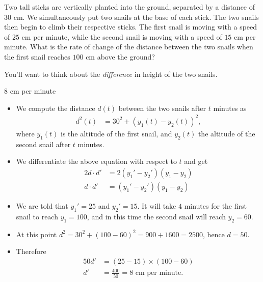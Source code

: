 %



\begin{Mquestion}[2015Q]
Two tall sticks are vertically planted into the ground, separated by a distance of $30$ cm. We simultaneously put two snails at the base of each stick. The two snails then begin to climb their respective sticks. The first snail is moving with a speed of $25$ cm per minute, while the second snail is moving with a speed of $15$ cm per minute.
What is the rate of
change of the distance between the two snails when the first snail reaches $100$ cm above the ground?
\end{Mquestion}
\begin{hint}
You'll want to think about the \emph{difference} in height of the two snails.
\end{hint}
\begin{answer}
$8$ cm per minute
\end{answer}
\begin{solution}
\begin{itemize}
 \item
We compute the distance $d(t)$ between the two snails after $t$ minutes as
\begin{align*}
d^2(t)&= 30^2 + (y_1(t)-y_2(t))^2,
\end{align*}
where $y_1(t)$ is the altitude of the first snail, and $y_2(t)$ the altitude of the second snail after $t$ minutes.
\item We differentiate the above equation with respect to $t$ and get
\begin{align*}
2d \cdot d' &= 2 ({y_1}' - {y_2}') (y_1 - y_2)\\
d \cdot d' &=  ({y_1}' - {y_2}') (y_1 - y_2)
\end{align*}
\item We are told that ${y_1}'=25$ and ${y_2}'=15$. It will take $4$ minutes
for the first snail to reach $y_1=100$, and in this time  the second snail will reach
$y_2=60$.
\item At this point $d^2 = 30^2 + (100-60)^2 = 900 + 1600 = 2500$, hence $d = 50$.
\item Therefore
\begin{align*}
50  d' &=  (25 - 15) \times (100 - 60)   \\
  d' &= \frac{400}{50} = 8 \text{ cm per minute}.
\end{align*}
\end{itemize}
\end{solution}



